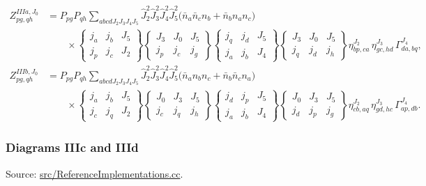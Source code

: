 \documentclass[
]{article}
\begin{document}
\begin{equation}
\begin{aligned}
Z^{IIIa,J_0}_{pg,qh}
&=P_{pg}P_{qh}\sum_{abcdJ_2J_3J_4J_5}
\hat J_2^2\hat J_3^2\hat J_4^2\hat J_5^2
\Big(\bar n_a\bar n_c n_b+\bar n_b n_a n_c\Big) \\
&\qquad\times
\begin{Bmatrix} j_a&j_b&J_5\\ j_p&j_c&J_2\end{Bmatrix}
\begin{Bmatrix} J_3&J_0&J_5\\ j_p&j_c&j_g\end{Bmatrix}
\begin{Bmatrix} j_q&j_d&J_5\\ j_a&j_b&J_4\end{Bmatrix}
\begin{Bmatrix} J_3&J_0&J_5\\ j_q&j_d&j_h\end{Bmatrix}
\eta^{J_2}_{bp,ca}\,
\eta^{J_3}_{gc,hd}\,
\Gamma^{J_4}_{da,bq},\\
Z^{IIIb,J_0}_{pg,qh}
&=P_{pg}P_{qh}\sum_{abcdJ_2J_3J_4J_5}
\hat J_2^2\hat J_3^2\hat J_4^2\hat J_5^2
\Big(\bar n_a n_b n_c+\bar n_b\bar n_c n_a\Big) \\
&\qquad\times
\begin{Bmatrix} j_a&j_b&J_5\\ j_c&j_q&J_2\end{Bmatrix}
\begin{Bmatrix} J_0&J_3&J_5\\ j_c&j_q&j_h\end{Bmatrix}
\begin{Bmatrix} j_d&j_p&J_5\\ j_a&j_b&J_4\end{Bmatrix}
\begin{Bmatrix} J_0&J_3&J_5\\ j_d&j_p&j_g\end{Bmatrix}
\eta^{J_2}_{cb,aq}\,
\eta^{J_3}_{gd,hc}\,
\Gamma^{J_4}_{ap,db}.
\end{aligned}
\end{equation}

\subsubsection{Diagrams IIIc and IIId}\label{diagrams-iiic-and-iiid}

Source:
\href{../src/ReferenceImplementations.cc\#L9556-L9868}{src/ReferenceImplementations.cc}.
\end{document}
